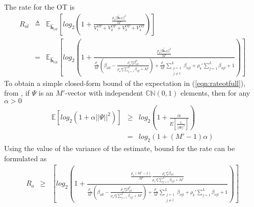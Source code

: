 \documentclass[10pt, a4paper, twoside,fleqn]{article}
\begin{document}
The rate for the OT is
\begin{eqnarray}\label{eqn:rateotfull}
	R_{ol} &\triangleq& \mathbb{E}_{\pmb{\hat h}_{ell}}\left[log_2\left(1+\frac{\frac{\rho_o||\pmb{\hat h}_{ell}||^2}{M'}}{V_1^{OT}+V_2^{OT}+V_3^{OT}+V_4^{OT}}\right) \right] \nonumber \\
            &=&  \mathbb{E}_{\pmb{\hat h}_{ell}}\left[log_2\left(1+\frac{\frac{\rho_o||\pmb{\hat h}_{ell}||^2}{M'}}
								 {\frac{\rho_o}{M'}(\beta_{oll}-\frac{\rho_o\tau_p^o\beta^2_{oll}}{\rho_o\tau_p^o\sum\limits_{j=1}^{L}\beta_{ojl}+M'})        
								  + \frac{\rho_o}{M'} \sum\limits_{\substack{j=1 \\ j\neq l}}^{L} \beta_{ojl} 
								  +\rho_b'\sum\limits_{j=1}^{L}\beta_{ojl}
								  +1}\right) \right]	
\end{eqnarray}
To obtain a simple closed-form bound of the expectation in (\ref{eqn:rateotfull}), from \cite{bib:dtsysBook}, if $\Psi$ is an $M'$-vector with independent ${\mathbb C}{\mathbb N}(0,1)$ elements, then for any $\alpha>0$
\begin{eqnarray}\label{eqn:bound}
	\mathbb{E}[log_2(1+\alpha||\Psi||^2)] &\geq& log_2\left(1+\frac{\alpha}{E[\frac{1}{||\Psi||^2}]}\right) \nonumber \\
                                              &=&  log_2(1+(M'-1)\alpha)
\end{eqnarray}
Using the value of the variance of the estimate, bound for the rate can be formulated as
\begin{eqnarray}
	R_o &\geq& \left[log_2\left(1+\frac{\frac{\rho_o(M'-1)}{M'}\frac{\rho_o\tau_p^o\beta_{oll}}{\rho_o\tau_p^o\sum\limits_{j=1}^{L}\beta_{ojl}+M'}}
								 {\frac{\rho_o}{M'}(\beta_{oll}-\frac{\rho_o\tau_p^o\beta^2_{oll}}{\rho_o\tau_p^o\sum\limits_{j=1}^{L}\beta_{ojl}+M'})        
								  + \frac{\rho_o}{M'} \sum\limits_{\substack{j=1 \\ j\neq l}}^{L} \beta_{ojl} 
								  +\rho_b'\sum\limits_{j=1}^{L}\beta_{ojl}
								  +1}\right) \right]	
\end{eqnarray}
{}

\enddocument
\end{document}
